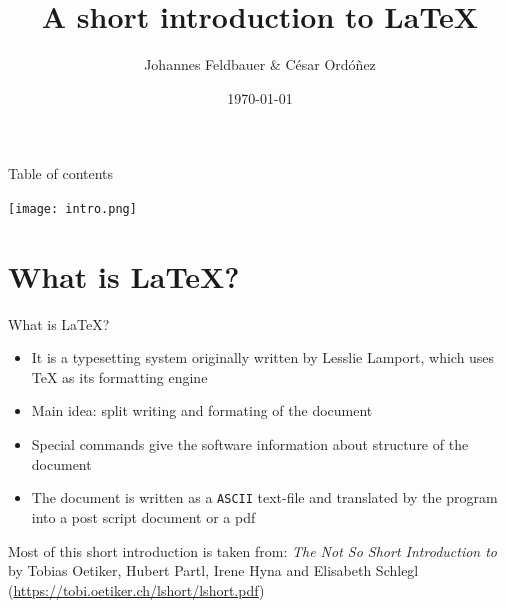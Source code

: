 \documentclass[presentation, aspectratio=1610]{beamer}
\title[Introduction to \LaTeX]{A short introduction to \LaTeX}
\author[J.Feldbauer, C. Ordóñez]{Johannes Feldbauer \& César Ordóñez}
\date{\today}
\begin{document}
	\maketitle
	\begin{frame}{Table of contents}
	\begin{minipage}[c][.75\textheight]{0.6\textwidth}
		\tableofcontents
	\end{minipage}
	\begin{minipage}{0.25\textwidth}
		\texttt{[image: intro.png]}
	\end{minipage}
	\end{frame}

	\section{What is \LaTeX ?}
	\begin{frame}{What is \LaTeX ?}
		\begin{itemize}[<+->]
			\item It is a typesetting system originally written by Lesslie Lamport, which uses \TeX{}  as its formatting engine
			\item Main idea: split writing and formating of the document
			\item Special commands give the software information about structure of the document
			\item The document is written as a \texttt{ASCII} text-file and translated by the program into a post script document or a pdf
		\end{itemize}
	\vfill
	\begin{block}{}
		{\footnotesize Most of this short introduction is taken from: \textit{The Not So Short Introduction to \LaTeXe} by Tobias Oetiker, Hubert Partl, Irene Hyna and Elisabeth Schlegl (\url{https://tobi.oetiker.ch/lshort/lshort.pdf})}
	\end{block}
	\end{frame}
\end{document}
